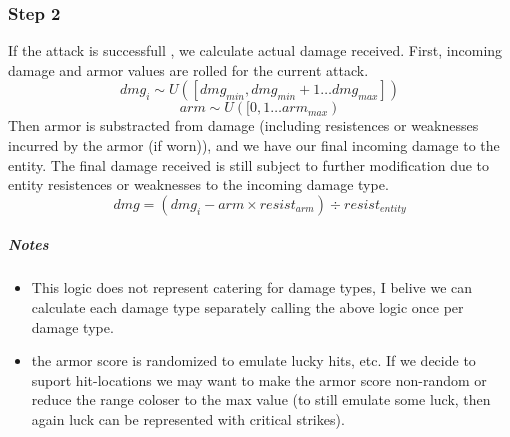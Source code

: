 \documentclass[a4paper,10pt]{book}
\begin{document}
\subsubsection*{Step 2}
If the attack is successfull , we calculate actual damage received. First,
incoming damage and armor values are rolled for the current attack.
\begin{equation*} dmg_i \sim U([dmg_{min}, dmg_{min}+1 \dots dmg_{max}]) \end{equation*}
\begin{equation*} arm \sim U([0,1 \dots arm_{max}) \end{equation*}
Then armor is substracted from damage (including resistences or weaknesses
incurred by the armor (if worn)), and we have our final incoming damage to the entity.
The final damage received is still subject to further modification due to entity
resistences or weaknesses to the incoming damage type.
\begin{equation*} dmg = (dmg_i - arm \times resist_{arm}) \div resist_{entity} \end{equation*}


%

\subparagraph*{Notes}
\begin{itemize}
  \item This logic does not represent catering for damage types, I belive we can
    calculate each damage type separately calling the above logic once per
    damage type.
  \item the armor score is randomized to emulate lucky hits, etc. If we decide to
    suport hit-locations we may want to make the armor score non-random or reduce
    the range coloser to the max value (to still emulate some luck, then again
    luck can be represented with critical strikes).
\end{itemize}
\end{document}
